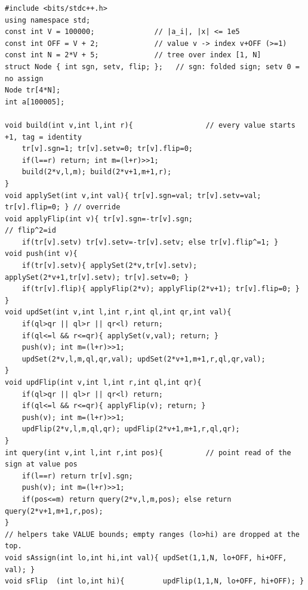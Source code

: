\begin{lstlisting}[caption={CF 1146E Summit: a segment tree over the VALUE axis holding a +/-1 sign with the assign+flip tag of lst:c15-compose; the answer is the initial value times its sign}, label={lst:c15-summit}]
#include <bits/stdc++.h>
using namespace std;
const int V = 100000;              // |a_i|, |x| <= 1e5
const int OFF = V + 2;             // value v -> index v+OFF (>=1)
const int N = 2*V + 5;             // tree over index [1, N]
struct Node { int sgn, setv, flip; };   // sgn: folded sign; setv 0 = no assign
Node tr[4*N];
int a[100005];

void build(int v,int l,int r){                 // every value starts +1, tag = identity
    tr[v].sgn=1; tr[v].setv=0; tr[v].flip=0;
    if(l==r) return; int m=(l+r)>>1;
    build(2*v,l,m); build(2*v+1,m+1,r);
}
void applySet(int v,int val){ tr[v].sgn=val; tr[v].setv=val; tr[v].flip=0; } // override
void applyFlip(int v){ tr[v].sgn=-tr[v].sgn;                                  // flip^2=id
    if(tr[v].setv) tr[v].setv=-tr[v].setv; else tr[v].flip^=1; }
void push(int v){
    if(tr[v].setv){ applySet(2*v,tr[v].setv); applySet(2*v+1,tr[v].setv); tr[v].setv=0; }
    if(tr[v].flip){ applyFlip(2*v); applyFlip(2*v+1); tr[v].flip=0; }
}
void updSet(int v,int l,int r,int ql,int qr,int val){
    if(ql>qr || ql>r || qr<l) return;
    if(ql<=l && r<=qr){ applySet(v,val); return; }
    push(v); int m=(l+r)>>1;
    updSet(2*v,l,m,ql,qr,val); updSet(2*v+1,m+1,r,ql,qr,val);
}
void updFlip(int v,int l,int r,int ql,int qr){
    if(ql>qr || ql>r || qr<l) return;
    if(ql<=l && r<=qr){ applyFlip(v); return; }
    push(v); int m=(l+r)>>1;
    updFlip(2*v,l,m,ql,qr); updFlip(2*v+1,m+1,r,ql,qr);
}
int query(int v,int l,int r,int pos){          // point read of the sign at value pos
    if(l==r) return tr[v].sgn;
    push(v); int m=(l+r)>>1;
    if(pos<=m) return query(2*v,l,m,pos); else return query(2*v+1,m+1,r,pos);
}
// helpers take VALUE bounds; empty ranges (lo>hi) are dropped at the top.
void sAssign(int lo,int hi,int val){ updSet(1,1,N, lo+OFF, hi+OFF, val); }
void sFlip  (int lo,int hi){         updFlip(1,1,N, lo+OFF, hi+OFF); }


\end{lstlisting}

